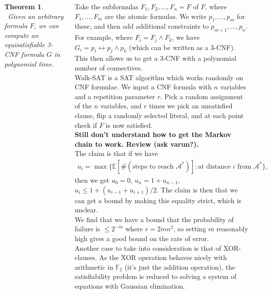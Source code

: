 \documentclass{tikzposter} %
\newtheorem{theorem}{Theorem}
\begin{document}
\begin{columns}
{  \begin{theorem}
  \ Given an arbitrary formula $F$, we can compute an equisatisfiable 3-CNF formula $G$ in polynomial time.
  \end{theorem}
  \hphantom{}

  Take the subformulas $F_{1},F_{2},\dots,F_{n} = F$ of $F$, where $F_{1},\dots,F_{m}$ are the atomic formulas. We write $p_{1},\dots,p_{m}$ for these, and then add additional constraints to $p_{m+1},\dots,p_{n}$. For example, where $F_{i} = F_{j} \land F_{k}$, we have $G_{i} = p_{i} \leftrightarrow p_{j} \land p_{k}$ (which can be written as a 3-CNF). This then allows us to get a 3-CNF with a polynomial number of connectives. \\

  Walk-SAT is a SAT algorithm which works randomly on CNF formulae. We input a CNF formula with $n$ variables and a repetition parameter $r$. Pick a random assignment of the $n$ variables, and $r$ times we pick an unsatisfied clause, flip a randomly selected literal, and at each point check if $F$ is now satisfied. \\

  \textbf{Still don't understand how to get the Markov chain to work. Review (ask varun?).} \\

  The claim is that if we have
  \begin{align*}
  u_{i} = \max \{\mathbb{E}[\#(\text{steps to reach } \mathcal{A^{*}})] : \text{at distance } i \text{ from } \mathcal{A}^{*}\},
  \end{align*}
  then we get $u_{0} = 0$, $u_{n} = 1 + u_{n-1}$, $u_{i} \le 1 + (u_{i-1} + u_{i+1})/2$. The claim is then that we can get a bound by making this equality strict, which is unclear. \\

  We find that we have a bound that the probability of failure is $\le 2^{-m}$ where $r = 2mn^{2}$, so setting $m$ reasonably high gives a good bound on the rate of error. \\

  Another case to take into consideration is that of XOR-clauses. As the XOR operation behaves nicely with arithmetic in $\mathbb{F}_{2}$ (it's just the addition operation), the satisfiability problem is reduced to solving a system of equations with Gaussian elimination. \\

  }
\end{columns}
\end{document}
